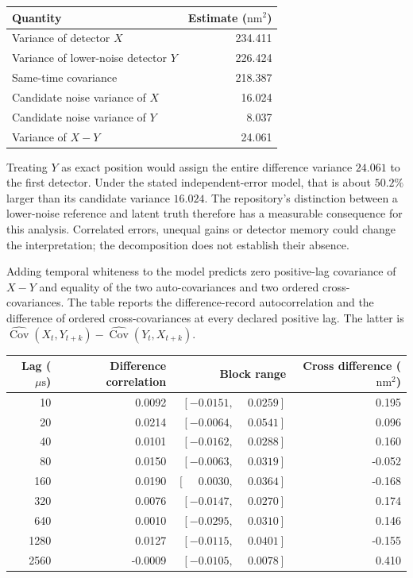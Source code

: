 \begin{center}
\begin{tabular}{lr}
\hline
Quantity & Estimate ($\mathrm{nm}^2$)\\
\hline
Variance of detector $X$ &234.411\\
Variance of lower-noise detector $Y$ &226.424\\
Same-time covariance &218.387\\
Candidate noise variance of $X$ &16.024\\
Candidate noise variance of $Y$ &8.037\\
Variance of $X-Y$ &24.061\\
\hline
\end{tabular}
\end{center}

Treating $Y$ as exact position would assign the entire difference variance
$24.061$ to the first detector. Under the stated independent-error model,
that is about $50.2\%$ larger than its candidate variance $16.024$. The
repository's distinction between a lower-noise reference and latent truth
therefore has a measurable consequence for this analysis. Correlated errors,
unequal gains or detector memory could change the interpretation; the
decomposition does not establish their absence.

Adding temporal whiteness to the model predicts zero positive-lag covariance
of $X-Y$ and equality of the two auto-covariances and two ordered
cross-covariances. The table reports the difference-record autocorrelation
and the difference of ordered cross-covariances at every declared positive
lag. The latter is $\widehat{\operatorname{Cov}}(X_t,Y_{t+k})-
\widehat{\operatorname{Cov}}(Y_t,X_{t+k})$.

\begin{center}
\begin{tabular}{rrrr}
\hline
Lag ($\mu\mathrm{s}$)&Difference correlation&Block range&Cross difference ($\mathrm{nm}^2$)\\
\hline
10   &0.0092&$[-0.0151,\phantom{-}0.0259]$& 0.195\\
20   &0.0214&$[-0.0064,\phantom{-}0.0541]$& 0.096\\
40   &0.0101&$[-0.0162,\phantom{-}0.0288]$& 0.160\\
80   &0.0150&$[-0.0063,\phantom{-}0.0319]$&-0.052\\
160  &0.0190&$[\phantom{-}0.0030,\phantom{-}0.0364]$&-0.168\\
320  &0.0076&$[-0.0147,\phantom{-}0.0270]$& 0.174\\
640  &0.0010&$[-0.0295,\phantom{-}0.0310]$& 0.146\\
1280 &0.0127&$[-0.0115,\phantom{-}0.0401]$&-0.155\\
2560 &-0.0009&$[-0.0105,\phantom{-}0.0078]$&0.410\\
\hline
\end{tabular}
\end{center}

